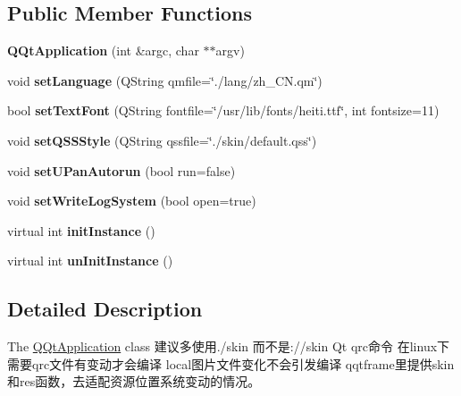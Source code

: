 \subsection*{Public Member Functions}
\begin{DoxyCompactItemize}
\item 
\mbox{\label{class_q_qt_application_ae300d15245e74d3f1bfd5611950f0d6a}} 
{\bfseries Q\+Qt\+Application} (int \&argc, char $\ast$$\ast$argv)
\item 
\mbox{\label{class_q_qt_application_a36dd4a97cf0e48f89e47f31a83bda8ac}} 
void {\bfseries set\+Language} (Q\+String qmfile=\char`\"{}./lang/zh\+\_\+\+C\+N.\+qm\char`\"{})
\item 
\mbox{\label{class_q_qt_application_a3bc890d153355d47aaccc204657bc05d}} 
bool {\bfseries set\+Text\+Font} (Q\+String fontfile=\char`\"{}/usr/lib/fonts/heiti.\+ttf\char`\"{}, int fontsize=11)
\item 
\mbox{\label{class_q_qt_application_a3af16e38667c0c54f9652ae9f4c769ed}} 
void {\bfseries set\+Q\+S\+S\+Style} (Q\+String qssfile=\char`\"{}./skin/default.\+qss\char`\"{})
\item 
\mbox{\label{class_q_qt_application_a7565235920764bde45b596103f1059ee}} 
void {\bfseries set\+U\+Pan\+Autorun} (bool run=false)
\item 
\mbox{\label{class_q_qt_application_a2f1c8dd859b57353e11faaf638cf9c2f}} 
void {\bfseries set\+Write\+Log\+System} (bool open=true)
\item 
\mbox{\label{class_q_qt_application_a6223857df1508f62a657c693c39d1552}} 
virtual int {\bfseries init\+Instance} ()
\item 
\mbox{\label{class_q_qt_application_a53a3c187aff4d2eff4ccc6096c19e4f4}} 
virtual int {\bfseries un\+Init\+Instance} ()
\end{DoxyCompactItemize}


\subsection{Detailed Description}
The \mbox{\hyperlink{class_q_qt_application}{Q\+Qt\+Application}} class 建议多使用./skin 而不是\+://skin Qt qrc命令 在linux下 需要qrc文件有变动才会编译 local图片文件变化不会引发编译 qqtframe里提供skin和res函数，去适配资源位置系统变动的情况。 

